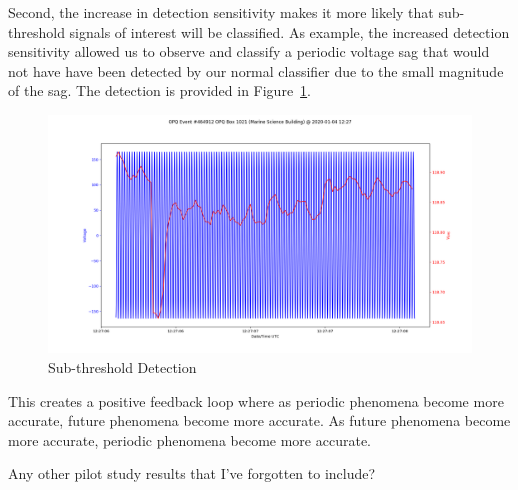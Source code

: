 Second, the increase in detection sensitivity makes it more likely that sub-threshold signals of interest will be classified. As example, the increased detection sensitivity allowed us to observe and classify a periodic voltage sag that would not have have been detected by our normal classifier due to the small magnitude of the sag. The detection is provided in Figure~\ref{fig:sub-threshold-detection}.

\begin{figure}[H]
    \centering
    \includegraphics[width=0.85\linewidth]{images/pilot/subthreshold-signal.png}
    \caption{Sub-threshold Detection}
    \label{fig:sub-threshold-detection}
\end{figure}

This creates a positive feedback loop where as periodic phenomena become more accurate, future phenomena become more accurate. As future phenomena become more accurate, periodic phenomena become more accurate.


\begin{tcolorbox}[title=ANTHONY AND SERGE]
Any other pilot study results that I've forgotten to include?
\end{tcolorbox}





